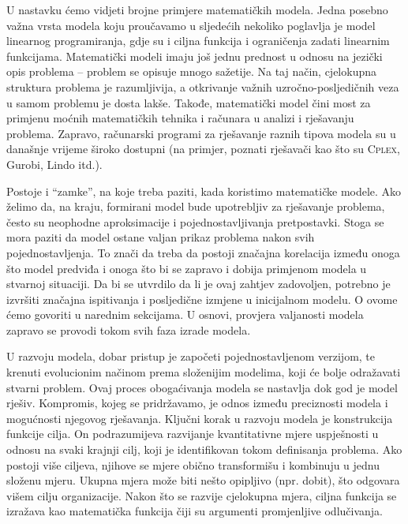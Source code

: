 \documentclass[a4paper, utf8, 11pt, colorlinks]{book}
\theoremstyle{definition}
\begin{document}
 U nastavku  ćemo vidjeti brojne primjere matematičkih modela. Jedna posebno važna vrsta modela koju proučavamo u sljedećih nekoliko poglavlja
je model linearnog programiranja, gdje su i ciljna funkcija i ograničenja zadati linearnim funkcijama. 
Matematički modeli imaju još jednu prednost u odnosu na jezički opis problema -- problem se opisuje mnogo sažetije. Na taj način, cjelokupna struktura problema je razumljivija, a otkrivanje važnih uzročno-posljedičnih veza u samom problemu je dosta lakše. Takođe, matematički
model čini most za primjenu moćnih matematičkih tehnika i računara u
analizi i rješavanju problema. Zapravo, računarski programi za rješavanje raznih tipova modela su  u današnje vrijeme  široko dostupni (na primjer, poznati rješavači kao što su \textsc{Cplex}, Gurobi, Lindo itd.). 

  Postoje i ``zamke'', na koje treba paziti, kada koristimo matematičke modele. Ako želimo da, na kraju, formirani model bude upotrebljiv za rješavanje problema, često  su neophodne aproksimacije i pojednostavljivanja pretpostavki. Stoga se mora paziti da model ostane valjan prikaz problema nakon svih pojednostavljenja. To znači da treba da postoji značajna korelacija između onoga što model predviđa i onoga što bi se zapravo i dobija primjenom modela u stvarnoj situaciji. Da bi se utvrdilo da li je ovaj zahtjev zadovoljen, potrebno je izvršiti značajna ispitivanja i posljedične izmjene u inicijalnom modelu. O ovome ćemo govoriti u narednim sekcijama. U osnovi, provjera valjanosti modela zapravo se provodi tokom svih  faza izrade modela. 
  
 U razvoju modela, dobar pristup je započeti pojednostavljenom verzijom, te   krenuti evolucionim načinom prema složenijim modelima, koji će bolje odražavati  stvarni problem. Ovaj proces obogaćivanja modela se nastavlja dok god je model rješiv. Kompromis, kojeg se pridržavamo, je odnos između preciznosti modela i mogućnosti njegovog rješavanja. Ključni korak u razvoju modela je konstrukcija funkcije cilja.
On podrazumijeva razvijanje kvantitativne mjere uspješnosti u odnosu na svaki   krajnji cilj, koji je identifikovan tokom definisanja problema.
Ako postoji više ciljeva, njihove se mjere obično transformišu
i kombinuju u jednu složenu mjeru.  Ukupna mjera može biti nešto opipljivo (npr. dobit), što odgovara višem cilju
organizacije.  Nakon što se razvije cjelokupna mjera,  ciljna funkcija se izražava kao matematička funkcija čiji su argumenti promjenljive odlučivanja. 
\end{document}
